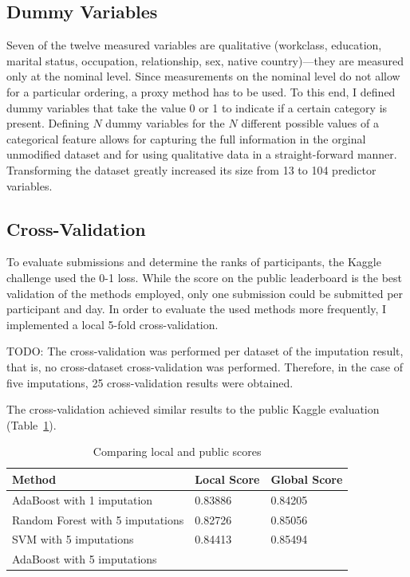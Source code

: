 \documentclass{article}
\begin{document}
\subsection{Dummy Variables}

Seven of the twelve measured variables are qualitative (workclass,
education, marital status, occupation, relationship, sex, native
country)---they are measured only at the nominal level. Since
measurements on the nominal level do not allow for a particular
ordering, a proxy method has to be used. To this end, I defined dummy
variables that take the value 0 or 1 to indicate if a certain
category is present. Defining $N$ dummy variables for the $N$
different possible values of a categorical feature allows for
capturing the full information in the orginal unmodified dataset and for using qualitative data in a straight-forward manner.
Transforming the dataset greatly increased its size from 13 to 104 predictor variables.

\subsection{Cross-Validation}
\label{sec:cross}

To evaluate submissions and determine the ranks of participants, the
Kaggle challenge used the 0-1 loss. While the score on the public leaderboard
is the best validation of the methods employed, only one submission
could be submitted per participant and day. In order to evaluate the
used methods more frequently, I implemented a local 5-fold cross-validation. 

TODO: The cross-validation was performed per dataset of the
imputation result, that is, no cross-dataset cross-validation was
performed. Therefore, in the case of five imputations, 25
cross-validation results were obtained.

The cross-validation achieved similar results to the public
Kaggle evaluation (Table~\ref{tab:localpublic}).

\begin{table}[H]
  \centering
  \begin{tabular}{lll}
    \toprule
    Method & Local Score & Global Score\\
    \midrule
    AdaBoost with 1 imputation & 0.83886 & 0.84205\\
    Random Forest with 5 imputations & 0.82726 & 0.85056\\
    SVM with 5 imputations & 0.84413 & 0.85494\\
    AdaBoost with 5 imputations & & \\
    \bottomrule
  \end{tabular}
  \caption{{Comparing local and public scores}}
  \label{tab:localpublic}
\end{table}
\end{document}
